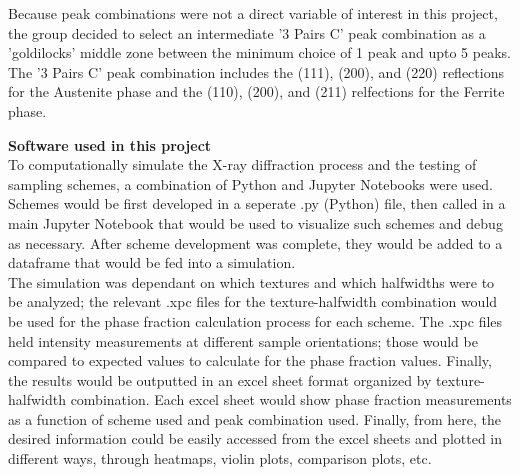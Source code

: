 \documentclass{article}
\begin{document}
Because peak combinations were not a direct variable of interest in this project, the group decided to select an intermediate '3 Pairs C' peak combination as a 'goldilocks' middle zone between the minimum choice of 1 peak and upto 5 peaks. The '3 Pairs C' peak combination includes the (111), (200), and (220) reflections for the Austenite phase and the (110), (200), and (211) relfections for the Ferrite phase.

    
    


\textbf{Software used in this project}\\

To computationally simulate the X-ray diffraction process and the testing of sampling schemes, a combination of Python and Jupyter Notebooks were used. \\

Schemes would be first developed in a seperate .py (Python) file, then called in a main Jupyter Notebook that would be used to visualize such schemes and debug as necessary. After scheme development was complete, they would be added to a dataframe that would be fed into a simulation.\\

The simulation was dependant on which textures and which halfwidths were to be analyzed; the relevant .xpc files for the texture-halfwidth combination would be used for the phase fraction calculation process for each scheme. The .xpc files held intensity measurements at different sample orientations; those would be compared to expected values to calculate for the phase fraction values. Finally, the results would be outputted in an excel sheet format organized by texture-halfwidth combination. Each excel sheet would show phase fraction measurements as a function of scheme used and peak combination used. Finally, from here, the desired information could be easily accessed from the excel sheets and plotted in different ways, through heatmaps, violin plots, comparison plots, etc.

\end{document}
